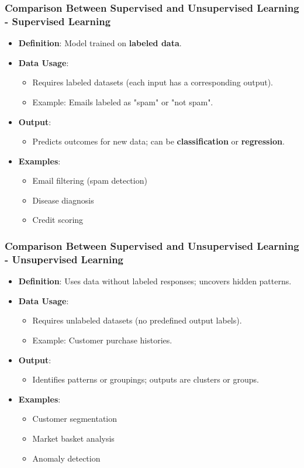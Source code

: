 \documentclass{beamer}
\begin{document}
\begin{frame}[fragile]
    \frametitle{Comparison Between Supervised and Unsupervised Learning - Supervised Learning}
    \begin{itemize}
        \item \textbf{Definition}: Model trained on \textbf{labeled data}.
        \item \textbf{Data Usage}:
        \begin{itemize}
            \item Requires labeled datasets (each input has a corresponding output).
            \item Example: Emails labeled as "spam" or "not spam".
        \end{itemize}
        \item \textbf{Output}:
        \begin{itemize}
            \item Predicts outcomes for new data; can be \textbf{classification} or \textbf{regression}.
        \end{itemize}
        \item \textbf{Examples}:
        \begin{itemize}
            \item Email filtering (spam detection)
            \item Disease diagnosis
            \item Credit scoring
        \end{itemize}
    \end{itemize}
\end{frame}

\begin{frame}[fragile]
    \frametitle{Comparison Between Supervised and Unsupervised Learning - Unsupervised Learning}
    \begin{itemize}
        \item \textbf{Definition}: Uses data without labeled responses; uncovers hidden patterns.
        \item \textbf{Data Usage}:
        \begin{itemize}
            \item Requires unlabeled datasets (no predefined output labels).
            \item Example: Customer purchase histories.
        \end{itemize}
        \item \textbf{Output}:
        \begin{itemize}
            \item Identifies patterns or groupings; outputs are clusters or groups.
        \end{itemize}
        \item \textbf{Examples}:
        \begin{itemize}
            \item Customer segmentation
            \item Market basket analysis
            \item Anomaly detection
        \end{itemize}
    \end{itemize}
\end{frame}
\end{document}
